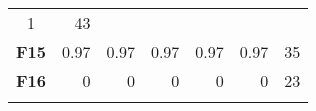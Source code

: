 \documentclass[12pt,a4paper]{article}
\begin{document}
\begin{longtable}[c]{@{}crrrrrr@{}}
\begin{minipage}[t]{0.11\columnwidth}
1
\strut\end{minipage} &
\begin{minipage}[t]{0.07\columnwidth}\raggedleft\strut
43
\strut\end{minipage}\tabularnewline
\begin{minipage}[t]{0.11\columnwidth}\centering\strut
\textbf{F15}
\strut\end{minipage} &
\begin{minipage}[t]{0.07\columnwidth}\raggedleft\strut
0.97
\strut\end{minipage} &
\begin{minipage}[t]{0.08\columnwidth}\raggedleft\strut
0.97
\strut\end{minipage} &
\begin{minipage}[t]{0.09\columnwidth}\raggedleft\strut
0.97
\strut\end{minipage} &
\begin{minipage}[t]{0.10\columnwidth}\raggedleft\strut
0.97
\strut\end{minipage} &
\begin{minipage}[t]{0.11\columnwidth}\raggedleft\strut
0.97
\strut\end{minipage} &
\begin{minipage}[t]{0.07\columnwidth}\raggedleft\strut
35
\strut\end{minipage}\tabularnewline
\begin{minipage}[t]{0.11\columnwidth}\centering\strut
\textbf{F16}
\strut\end{minipage} &
\begin{minipage}[t]{0.07\columnwidth}\raggedleft\strut
0
\strut\end{minipage} &
\begin{minipage}[t]{0.08\columnwidth}\raggedleft\strut
0
\strut\end{minipage} &
\begin{minipage}[t]{0.09\columnwidth}\raggedleft\strut
0
\strut\end{minipage} &
\begin{minipage}[t]{0.10\columnwidth}\raggedleft\strut
0
\strut\end{minipage} &
\begin{minipage}[t]{0.11\columnwidth}\raggedleft\strut
0
\strut\end{minipage} &
\begin{minipage}[t]{0.07\columnwidth}\raggedleft\strut
23
\strut\end{minipage}\tabularnewline
\begin{minipage}[t]{0.11\columnwidth}\centering\strut

\end{minipage}
\end{longtable}
\end{document}
